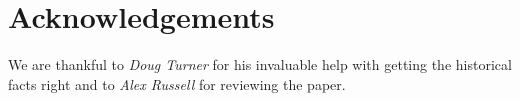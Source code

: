 \documentclass[sigconf,hyphens]{acmart}
\begin{document}
\section*{Acknowledgements}

We are thankful to \textit{Doug Turner} for his invaluable help
with getting the historical facts right and to \textit{Alex Russell} for reviewing the paper.


\balance 

\end{document}
